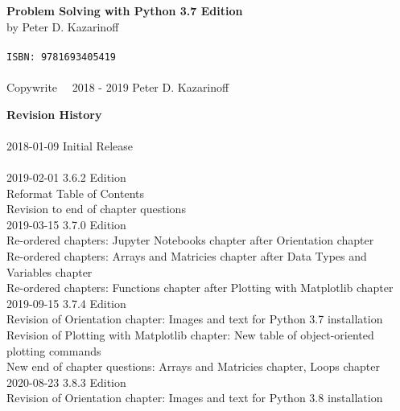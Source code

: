 
\textbf{Problem Solving with Python 3.7 Edition} \\
by Peter D. Kazarinoff \\
\\
\texttt{ISBN: 9781693405419} \\
\\
Copywrite \  \textcopyright \  2018 - 2019 Peter D. Kazarinoff\\

\vspace{3in}

\textbf{Revision History}\\
\\
2018-01-09 Initial Release\\
\\
2019-02-01 3.6.2 Edition\\
Reformat Table of Contents\\
Revision to end of chapter questions\\

2019-03-15 3.7.0 Edition \\
Re-ordered chapters: Jupyter Notebooks chapter after Orientation chapter \\
Re-ordered chapters: Arrays and Matricies chapter after Data Types and Variables chapter \\
Re-ordered chapters: Functions chapter after Plotting with Matplotlib chapter \\

2019-09-15 3.7.4 Edition \\
Revision of Orientation chapter: Images and text for Python 3.7 installation \\
Revision of Plotting with Matplotlib chapter: New table of object-oriented plotting commands \\
New end of chapter questions: Arrays and Matricies chapter, Loops chapter \\

2020-08-23 3.8.3 Edition \\
Revision of Orientation chapter: Images and text for Python 3.8 installation \\
